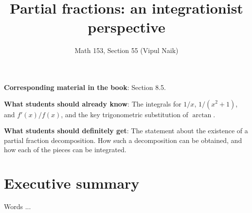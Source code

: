 \documentclass[10pt]{amsart}
\title{Partial fractions: an integrationist perspective}
\author{Math 153, Section 55 (Vipul Naik)}
\begin{document}
\maketitle

{\bf Corresponding material in the book}: Section 8.5.

{\bf What students should already know}: The integrals for $1/x$,
$1/(x^2 + 1)$, and $f'(x)/f(x)$, and the key trigonometric
substitution of $\arctan$.

{\bf What students should definitely get}: The statement about the
existence of a partial fraction decomposition. How such a
decomposition can be obtained, and how each of the pieces can be integrated.

\section*{Executive summary}

Words ...
\end{document}
